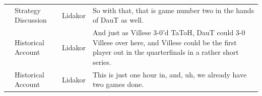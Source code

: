 {\begin{longtable}{@{}>{\theAppRow}r|L{2.3cm}L{1.0cm}U{11.55cm}@{}}
    & Strategy Discussion   & Lidakor & So with that, that is game number two in the hands of DauT as well.                                                                                                                                                                                                                             \\
    & Historical Account    & Lidakor & And just as Villese 3-0'd TaToH, DauT could 3-0 Villese over here, and Villese could be the first player out in the quarterfinals in a rather short series.                                                                                                                                     \\
    & Historical Account    & Lidakor & This is just one hour in, and, uh, we already have two games done.
  \end{longtable}
} %

